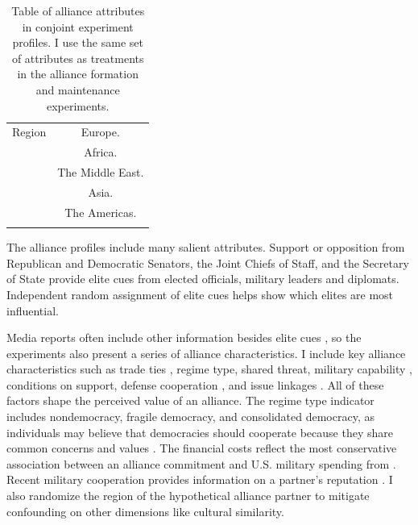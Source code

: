 \documentclass[12pt]{article}
\begin{document}
\begin{table}
\begin{adjustbox}{width = .99\textwidth}
\begin{tabular}{lc}
Region              & Europe. \\ 
                    & Africa. \\
                    & The Middle East. \\ 
                    & Asia. \\   
                    & The Americas. \\ 
                                                                            
\hline \\
\end{tabular}
\end{adjustbox}
\caption{Table of alliance attributes in conjoint experiment profiles. I use the same set of attributes as treatments in the alliance formation and maintenance experiments.} 
\label{tab:conjoint-vars}
\end{table}


The alliance profiles include many salient attributes.
Support or opposition from Republican and Democratic Senators, the Joint Chiefs of Staff, and the Secretary of State provide elite cues from elected officials, military leaders and diplomats. 
Independent random assignment of elite cues helps show which elites are most influential.


Media reports often include other information besides elite cues \citep{BaumPotter2008}, so the experiments also present a series of alliance characteristics. 
I include key alliance characteristics such as trade ties \citep{Fordham2010}, regime type, shared threat, military capability \citep{Johnsonetal2015}, conditions on support, defense cooperation \citep{Morrow1994, LeedsAnac2005}, and issue linkages \citep{Poast2012}.
All of these factors shape the perceived value of an alliance. 
The regime type indicator includes nondemocracy, fragile democracy, and consolidated democracy, as individuals may believe that democracies should cooperate because they share common concerns and values \citep{Chuetal2021}. 
The financial costs reflect the most conservative association between an alliance commitment and U.S. military spending from \citet{AlleyFuhrmann2021}. 
Recent military cooperation provides information on a partner's reputation \citep{Crescenzietal2012, GannonKent2020}.
I also randomize the region of the hypothetical alliance partner to mitigate confounding on other dimensions like cultural similarity.
\end{document}
